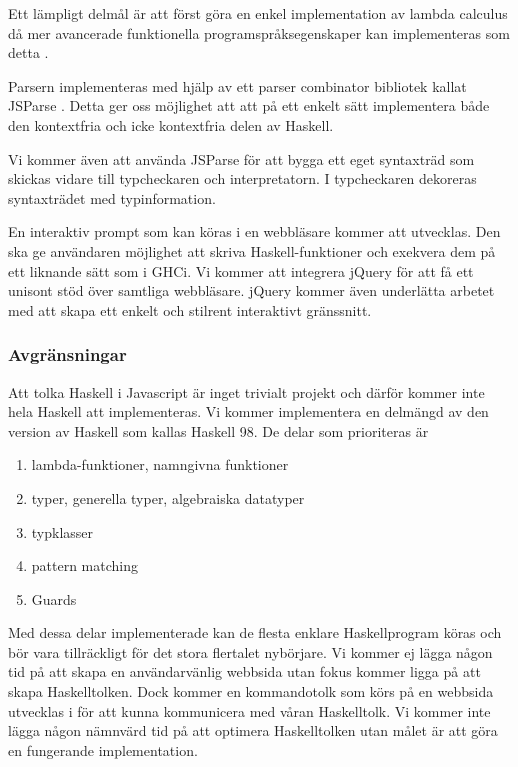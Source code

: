 Ett lämpligt delmål är att först göra en enkel implementation av lambda calculus då mer avancerade funktionella programspråksegenskaper kan implementeras som detta \citep{jones87}.

 Parsern implementeras med hjälp av ett parser combinator bibliotek kallat JSParse  \citep{jsparse}. Detta ger oss möjlighet att att på ett enkelt sätt implementera både den kontextfria och icke kontextfria delen av Haskell.

Vi kommer även att använda JSParse för att bygga ett eget syntaxträd som skickas vidare till typcheckaren och interpretatorn. I typcheckaren dekoreras syntaxträdet med typinformation.

En interaktiv prompt som kan köras i en webbläsare kommer att utvecklas. Den ska ge användaren möjlighet att skriva Haskell-funktioner och exekvera dem på ett liknande sätt som i GHCi. 
Vi kommer att integrera jQuery \citep{jquery} för att få ett unisont stöd över samtliga webbläsare. jQuery kommer även underlätta arbetet med att skapa ett enkelt och stilrent interaktivt gränssnitt.

\subsubsection{Avgränsningar} 
Att tolka Haskell i Javascript är inget trivialt projekt och därför kommer inte hela Haskell att implementeras. Vi kommer implementera en delmängd av den version av Haskell som kallas Haskell 98.
De delar som prioriteras är
        \begin{enumerate}
            \item{lambda-funktioner, namngivna funktioner}
            \item{typer, generella typer, algebraiska datatyper}
            \item{typklasser}
            \item{pattern matching}
            \item{Guards}
        \end{enumerate}
Med dessa delar implementerade kan de flesta enklare Haskellprogram köras och bör vara tillräckligt för det stora flertalet nybörjare. Vi kommer ej lägga någon tid på att skapa en användarvänlig webbsida utan fokus kommer ligga på att skapa Haskelltolken. Dock kommer en kommandotolk som körs på en webbsida utvecklas i för att kunna kommunicera med våran Haskelltolk. 
Vi kommer inte lägga någon nämnvärd tid på att optimera Haskelltolken utan målet är att göra en fungerande implementation. 

